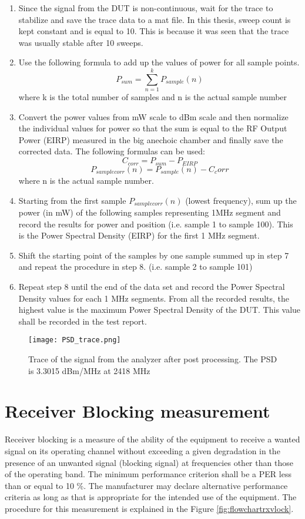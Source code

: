 \begin{enumerate}
\item Since the signal from the \acs{DUT} is non-continuous, wait for the trace to stabilize and save the trace data to a mat file. In this thesis, sweep count is kept constant and is equal to 10. This is because it was seen that the trace was usually stable after 10 sweeps.

 
 \item Use the following formula to add up the values of power for all sample points.
  $$ P_{sum} = \sum_{n=1}^{k} P_{sample}(n) $$ where k is the total number of samples and n is the actual sample number
  
 \item  Convert the power values from mW scale to dBm scale and then normalize the individual values for power so that the sum is equal to the \acs{RF} Output Power (\acs{EIRP}) measured in the big anechoic chamber and finally save the corrected data. The following formulas can be used:
  $$C_{corr} = P_{sum} - P_{EIRP}   $$ 
  $$P_{samplecorr}(n) = P_{sample}(n) - C_corr $$ where n is the actual sample number.
  
  \item Starting from the first sample $P_{samplecorr}(n)$ (lowest frequency), sum up the power (in mW) of the following samples representing 1MHz segment and record the results for power and position (i.e. sample 1 to sample 100). This is the Power Spectral Density (\acs{EIRP}) for the first 1 MHz segment.
  
  \item Shift the starting point of the samples by one sample summed up in step 7 and repeat the procedure in step 8. (i.e. sample 2 to sample 101)
  
  \item Repeat step 8 until the end of the data set and record the Power Spectral Density values for each 1 MHz segments. From all the recorded results, the highest value is the maximum Power Spectral Density of the \acs{DUT}. This value shall be recorded in the test report.
    \end{enumerate}
  
 \begin{figure}[H]
\centering
\texttt{[image: PSD\_trace.png]}
\caption{Trace of the signal from the analyzer after post processing. The \acs{PSD} is 3.3015 dBm/MHz at 2418 MHz}
\label{fig:psdtraceI}
\end{figure}
  
  
 \section{Receiver Blocking measurement}
\label{sec:rxmeas} 
Receiver blocking is a measure of the ability of the equipment to receive a wanted signal on its operating channel without exceeding a given degradation in the presence of an unwanted signal (blocking signal) at frequencies other than those of the operating band. The minimum performance criterion shall be a \ac{PER} less than or equal to 10 \%. The manufacturer may declare alternative performance criteria as long as that is appropriate for the intended use of the equipment. The procedure for this measurement is explained in the Figure \ref{fig:flowchartrxvlock}.

